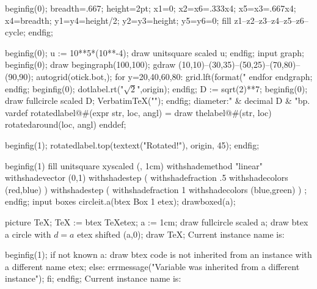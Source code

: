 \newbox\mympbox
\def\prependtomplibbox{\global\setbox\mympbox}%
\mplibcode
beginfig(0);
breadth=.667\mpdim\hsize;
height=2pt;
x1=0; x2=x6=.333x4; x5=x3=.667x4;
x4=breadth;
y1=y4=height/2; y2=y3=height; y5=y6=0;
fill z1--z2--z3--z4--z5--z6--cycle;
endfig;
\endmplibcode
\copy\mympbox
\copy\mympbox
\copy\mympbox
\copy\mympbox

\mplibnoforcehmode
{}%
\mplibcode
beginfig(0);
u := 10**5*(10**-4);
draw unitsquare scaled u;
endfig;
\endmplibcode
{}%
\mplibcode
  input graph;
  beginfig(0);
  draw begingraph(100,100);
    gdraw (10,10)--(30,35)--(50,25)--(70,80)--(90,90);
    autogrid(otick.bot,);
    for y=20,40,60,80:
      grid.lft(format("%
    endfor
    endgraph;
  endfig;
\endmplibcode
{}%
\mplibcode
beginfig(0);
dotlabel.rt("$\sqrt2$",origin);
endfig;
\endmplibcode
\leavevmode
\mplibcode
   D := sqrt(2)**7;
   beginfig(0);
   draw fullcircle scaled D;
   VerbatimTeX("\gdef\Dia{" & decimal D & "}");
   endfig;
\endmplibcode
diameter:\Dia bp.%
\mplibcode
  vardef rotatedlabel@#(expr str, loc, angl) =
    draw thelabel@#(str, loc) rotatedaround(loc, angl)
  enddef;

  beginfig(1);
    rotatedlabel.top(textext("Rotated!"), origin, 45);
  endfig;
\endmplibcode
\par
{}%
\mplibcode
beginfig(1)
fill unitsquare xyscaled (\mpdim\hsize, 1cm)
    withshademethod "linear"
    withshadevector (0,1)
    withshadestep (
       withshadefraction .5
       withshadecolors (red,blue)
    )
    withshadestep (
       withshadefraction 1
       withshadecolors (blue,green)
    )
    ;
endfig;
\endmplibcode
{}%
\mpfigx input boxes \endfig
\mpfig circleit.a(btex Box 1 etex); drawboxed(a); \endfig
{}

\baselineskip
{}

\mplibcode[instanceOne]
  picture TeX;
  TeX := btex \TeX etex;
a := 1cm;
draw fullcircle scaled a;
draw btex a circle with $d=a$ etex shifted (a,0);
draw TeX;
\endmplibcode
Current instance name is: \currentmpinstancename {}\baselineskip

\mplibcode[instanceTwo]
beginfig(1);
if not known a:
  draw btex code is not inherited from an instance with a different name etex;
else:
  errmessage("Variable was inherited from a different instance");
fi;
endfig;
\endmplibcode
Current instance name is: \currentmpinstancename {}\baselineskip

